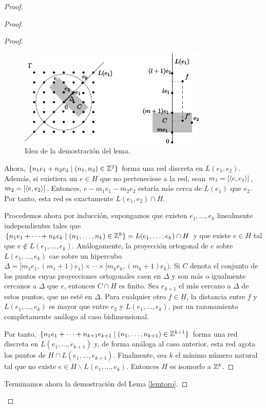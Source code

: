 \begin{proof}
\begin{proof}
\begin{proof}
  \begin{figure}[h]
    \centering
    \includegraphics[width=0.8\textwidth]{pics/grupo}
    \caption{\small Idea de la demostración del lema.}
    \label{fig:grupo}
  \end{figure}

      Ahora, $\{n_1e_1+n_2e_2 \mid (n_1,n_2) \in \mathbb{Z}^2 \}$ forma una red discreta en $L(e_1,e_2)$. Además, si existiera un $e\in H$ que no perteneciese a la red, sean $m_1=[\left\langle e,e_1\right\rangle]$, $m_2=[\left\langle e,e_2\right\rangle]$. Entonces, $e-m_1e_1-m_2e_2$ estaría más cerca de $L(e_1)$ que $e_2$. Por tanto, esta red es exactamente $L(e_1,e_2) \cap H$.

      Procedemos ahora por inducción, supongamos que existen $e_1,\dots,e_k$ linealmente independientes tales que $\{n_1e_1+\cdots+n_ke_k \mid (n_1,\dots,n_k) \in \mathbb{Z}^k \} = L(e_1,\dots,e_k) \cap H$ y que existe $e\in H$ tal que $e \not\in L(e_1,\dots,e_k)$. Análogamente, la proyección ortogonal de $e$ sobre $L(e_1,\dots,e_k)$ cae sobre un hipercubo $\Delta=[m_1e_1,(m_1+1)e_1) \times \cdots \times [m_ke_k,(m_k+1)e_k)$. Si $C$ denota el conjunto de los puntos cuyas proyecciones ortogonales caen en $\Delta$ y son más o igualmente cercanos a $\Delta$ que $e$, entonces $C \cap H$ es finito. Sea $e_{k+1}$ el más cercano a $\Delta$ de estos puntos, que no esté en $\Delta$. Para cualquier otro $f \in H$, la distancia entre $f$ y $L(e_1,\dots,e_k)$ es mayor que entre $e_2$ y $L(e_1,\dots,e_k)$, por un razonamiento completamente análogo al caso bidimensional. 

	Por tanto, $\{n_1e_1+\dots+n_{k+1}e_{k+1} \mid (n_1,\dots,n_{k+1}) \in \mathbb{Z}^{k+1}\}$ forma una red discreta en $L(e_1,\dots,e_{k+1})$ y, de forma análoga al caso anterior, esta red agota los puntos de $H\cap L(e_1,\dots,e_{k+1})$.
	Finalmente, sea $k$ el mínimo número natural tal que no existe $e \in H \backslash L(e_1,\dots,e_k)$. Entonces $H$ es isomorfo a $\mathbb{Z}^k$.
\end{proof}

Terminamos ahora la demostración del Lema \ref{lemtoro}.
 

\end{proof}
\end{proof}
